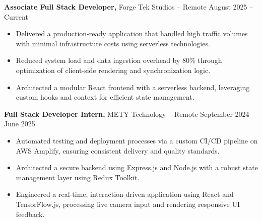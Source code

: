 \documentclass[11pt]{article}       %
\begin{document}
\textbf{Associate Full Stack Developer,} {Forge Tek Studios} -- Remote \hfill August 2025 -- Current 
\vspace{-9pt}
\begin{itemize}
  \item Delivered a production-ready application that handled high traffic volumes with minimal infrastructure costs using serverless technologies.
  \item Reduced system load and data ingestion overhead by 80\% through optimization of client-side rendering and synchronization logic.
  \item Architected a modular React frontend with a serverless backend, leveraging custom hooks and context for efficient state management.
\end{itemize}

\textbf{Full Stack Developer Intern,} {METY Technology} -- Remote \hfill September 2024 -- June 2025 
\vspace{-9pt}
\begin{itemize}
  \item Automated testing and deployment processes via a custom CI/CD pipeline on AWS Amplify, ensuring consistent delivery and quality standards.
  \item Architected a secure backend using Express.js and Node.js with a robust state management layer using Redux Toolkit.
  \item Engineered a real-time, interaction-driven application using React and TensorFlow.js, processing live camera input and rendering responsive UI feedback.
\end{itemize}

\end{document}
